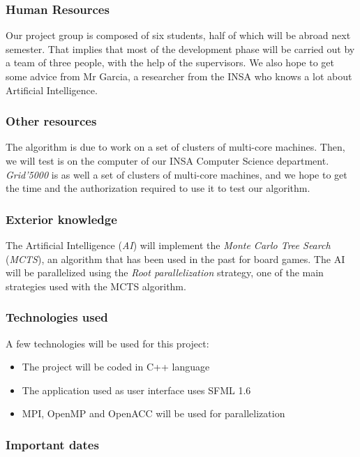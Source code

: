 \subsubsection{Human Resources}

Our project group is composed of six students, half of which will be abroad next semester.
That implies that most of the development phase will be carried out by a team of three people, with the help of the supervisors.
We also hope to get some advice from Mr Garcia, a researcher from the INSA who knows a lot about Artificial Intelligence.

\subsubsection{Other resources}

The algorithm is due to work on a set of clusters of multi-core machines. Then, we will test is on the computer of our INSA Computer Science department.
\emph{Grid'5000} is as well a set of clusters of multi-core machines, and we hope to get the time and the authorization required to use it to test our algorithm.

\subsubsection{Exterior knowledge}

The Artificial Intelligence (\emph{AI}) will implement the \emph{Monte Carlo Tree Search} (\emph{MCTS}), an algorithm that has been used in the past for board games.
The AI will be parallelized using the \emph{Root parallelization} strategy, one of the main strategies used with the MCTS algorithm.

\subsubsection{Technologies used}

A few technologies will be used for this project:
\begin{itemize}
	\item The project will be coded in C++ language
	\item The application used as user interface uses SFML 1.6
	\item MPI, OpenMP and OpenACC will be used for parallelization
\end{itemize}

\subsubsection{Important dates}

